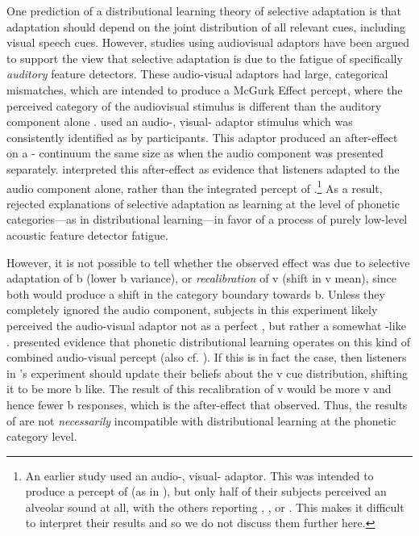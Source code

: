 One prediction of a distributional learning theory of selective adaptation is that adaptation should depend on the joint distribution of all relevant cues, including visual speech cues.  However, studies using audiovisual adaptors \cite{Roberts1981,Saldana1994} have been argued to support the view that selective adaptation is due to the fatigue of specifically \emph{auditory} feature detectors.  These audio-visual adaptors had large, categorical mismatches, which are intended to produce a McGurk Effect percept, where the perceived category of the audiovisual stimulus is different than the auditory component alone \cite{McGurk1976}.   used an audio-, visual- adaptor stimulus which was consistently identified as  by participants.  This adaptor produced an after-effect on a - continuum the same size as when the audio  component was presented separately.   interpreted this after-effect as evidence that listeners adapted to the audio component alone, rather than the integrated percept of .\footnote{An earlier study \protect\cite{Roberts1981} used an audio-, visual- adaptor.  This was intended to produce a percept of  (as in \protect{}), but only half of their subjects perceived an alveolar sound at all, with the others reporting , , or  \protect\cite{Saldana1994}.  This makes it difficult to interpret their results and so we do not discuss them further here.}  As a result,  rejected explanations of selective adaptation as learning at the level of phonetic categories---as in distributional learning---in favor of a process of purely low-level acoustic feature detector fatigue.

However, it is not possible to tell whether the observed effect was due to selective adaptation of \ph b (lower \ph b variance), or \emph{recalibration} of \ph v (shift in \ph v mean), since both would produce a shift in the category boundary towards \ph b.  Unless they completely ignored the audio component, subjects in this experiment likely perceived the audio-visual adaptor not as a perfect , but rather a somewhat -like .   presented evidence that phonetic distributional learning operates on this kind of combined audio-visual percept (also cf. ).  If this is in fact the case, then listeners in \citeauthor{Saldana1994}'s experiment should update their beliefs about the \ph v cue distribution, shifting it to be more \ph b like.  The result of this recalibration of \ph v would be more \ph v and hence fewer \ph b responses, which is the after-effect that  observed.  Thus, the results of  are not \emph{necessarily} incompatible with distributional learning at the phonetic category level. 

